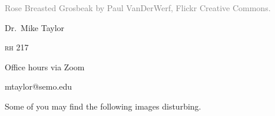 \documentclass[t]{beamer}
\begin{document}


{
\begin{frame}[b,plain]
	\tiny\textcolor{gray}{Rose Breasted Grosbeak by Paul VanDerWerf, Flickr Creative Commons.}
\end{frame}
}

{
\begin{frame}[t]
	\large
	\vspace{5ex}
	\hangpara\hspace{17em} Dr.~Mike Taylor

	\hangpara\hspace{17em} \textsc{rh} 217
	
	\hangpara \hspace{17em} Office hours via Zoom


	\hangpara\hspace{17em} mtaylor@semo.edu
	

\end{frame}
}


\begin{frame}{}

\hangpara Some of you may find the following images disturbing.

\end{frame}
\end{document}
